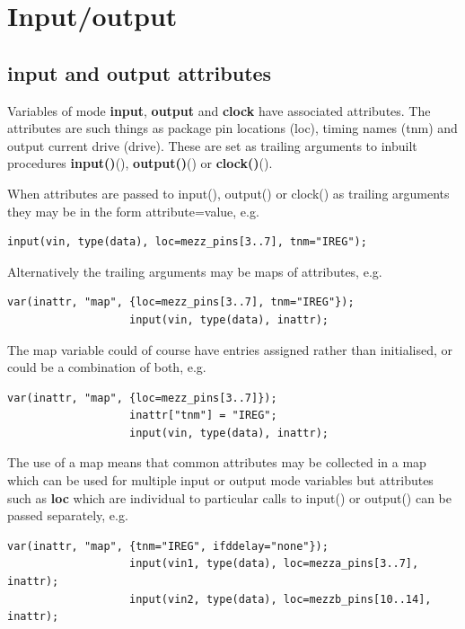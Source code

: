     \section{Input/output}\label{sec:input_output}

        \subsection{input and output attributes}

            Variables of mode {\bf input}, {\bf output} and {\bf clock} have
            associated attributes. The attributes are such things as package pin
            locations (loc), timing names (tnm) and output current drive
            (drive). These are set as trailing arguments to inbuilt procedures {\bf
            input()}(), {\bf
            output()}() or {\bf
            clock()}().

            When attributes are passed to input(), output() or clock() as trailing
            arguments they may be in the form attribute=value, e.g.
            \begin{lstlisting}[gobble=12, language=threepl]
                   input(vin, type(data), loc=mezz_pins[3..7], tnm="IREG");
            \end{lstlisting}

            Alternatively the trailing arguments may be maps of attributes, e.g.
            \begin{lstlisting}[gobble=12, language=threepl]
                   var(inattr, "map", {loc=mezz_pins[3..7], tnm="IREG"});
                   input(vin, type(data), inattr);
            \end{lstlisting}

            The map variable could of course have entries assigned rather than
            initialised, or could be a combination of both, e.g.
            \begin{lstlisting}[gobble=12, language=threepl]
                   var(inattr, "map", {loc=mezz_pins[3..7]});
                   inattr["tnm"] = "IREG";
                   input(vin, type(data), inattr);
            \end{lstlisting}

            The use of a map means that common attributes may be collected in a
            map which can be used for multiple input or output mode variables but
            attributes such as {\bf loc} which are individual to particular calls
            to input() or output() can be passed separately, e.g.
            \begin{lstlisting}[gobble=12, language=threepl]
                   var(inattr, "map", {tnm="IREG", ifddelay="none"});
                   input(vin1, type(data), loc=mezza_pins[3..7], inattr);
                   input(vin2, type(data), loc=mezzb_pins[10..14], inattr);
            \end{lstlisting}
            
